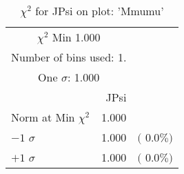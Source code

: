  \begin{table}[h!]\centering
 {\small{
 \begin{tabular}{||l||r||r||}
 \hline
 \hline
\multicolumn{2}{||c||}{$\chi^{2}$ Min   1.000} & \\
 \multicolumn{2}{||c||}{Number of bins used:   1.} & \\
\multicolumn{2}{||c||}{One $\sigma$:    1.000} & \\
 \hline
 \hline
    & JPsi & \\
Norm at Min $\chi^{2}$  &   1.000 & \\
$-1$ $\sigma$ &   1.000  &  $($  0.0$\%)$  \\
$+1$ $\sigma$ &   1.000  &  $($  0.0$\%)$  \\
 \hline
 \hline
 \end{tabular}
 \caption{$\chi^{2}$ for JPsi on plot: 'Mmumu'}
 \label{tab-chijpsi}
 }}
 \end{table}
 \endinput
